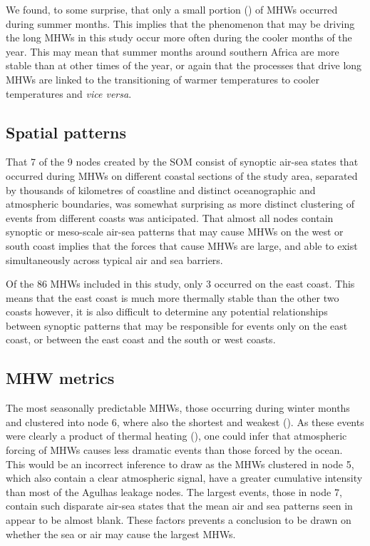 \documentclass[a4paper,10pt,review]{elsarticle}
\begin{document}
We found, to some surprise, that only a small portion () of MHWs occurred during summer months. This implies that the phenomenon that may be driving the long MHWs in this study occur more often during the cooler months of the year. This may mean that summer months around southern Africa are more stable than at other times of the year, or again that the processes that drive long MHWs are linked to the transitioning of warmer temperatures to cooler temperatures and \emph{vice versa}.

\subsection{Spatial patterns}
That 7 of the 9 nodes created by the SOM consist of synoptic air-sea states that occurred during MHWs on different coastal sections of the study area, separated by thousands of kilometres of coastline and distinct oceanographic and atmospheric boundaries, was somewhat surprising as more distinct clustering of events from different coasts was anticipated. That almost all nodes contain synoptic or meso-scale air-sea patterns that may cause MHWs on the west or south coast implies that the forces that cause MHWs are large, and able to exist simultaneously across typical air and sea barriers. 

Of the 86 MHWs included in this study, only 3 occurred on the east coast. This means that the east coast is much more thermally stable than the other two coasts however, it is also difficult to determine any potential relationships between synoptic patterns that may be responsible for events only on the east coast, or between the east coast and the south or west coasts.

\subsection{MHW metrics}
The most seasonally predictable MHWs, those occurring during winter months and clustered into node 6, where also the shortest and weakest (). As these events were clearly a product of thermal heating (), one could infer that atmospheric forcing of MHWs causes less dramatic events than those forced by the ocean. This would be an incorrect inference to draw as the MHWs clustered in node 5, which also contain a clear atmospheric signal, have a greater cumulative intensity than most of the Agulhas leakage nodes. The largest events, those in node 7, contain such disparate air-sea states that the mean air and sea patterns seen in  appear to be almost blank. These factors prevents a conclusion to be drawn on whether the sea or air may cause the largest MHWs.
\end{document}
